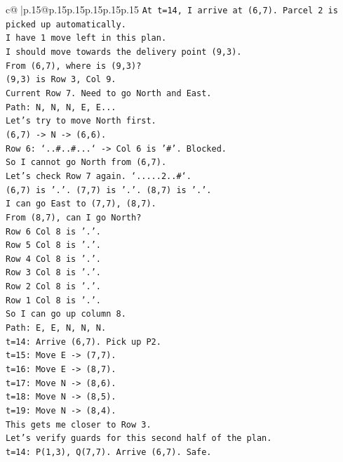 \documentclass{article}
\begin{document}
{\begin{supertabular}{c@{$\;$}|p{.15\linewidth}@{}p{.15\linewidth}p{.15\linewidth}p{.15\linewidth}p{.15\linewidth}p{.15\linewidth}}
{{{\texttt{At t=14, I arrive at (6,7). Parcel 2 is picked up automatically.} \\
\texttt{I have 1 move left in this plan.} \\
\texttt{I should move towards the delivery point (9,3).} \\
\texttt{From (6,7), where is (9,3)?} \\
\texttt{(9,3) is Row 3, Col 9.} \\
\texttt{Current Row 7. Need to go North and East.} \\
\texttt{Path: N, N, N, E, E...} \\
\texttt{Let's try to move North first.} \\
\texttt{(6,7) {-}> N {-}> (6,6).} \\
\texttt{Row 6: `..\#..\#...` {-}> Col 6 is '\#'. Blocked.} \\
\texttt{So I cannot go North from (6,7).} \\
\texttt{Let's check Row 7 again. `.....2..\#`.} \\
\texttt{(6,7) is '.'. (7,7) is '.'. (8,7) is '.'.} \\
\texttt{I can go East to (7,7), (8,7).} \\
\texttt{From (8,7), can I go North?} \\
\texttt{Row 6 Col 8 is '.'.} \\
\texttt{Row 5 Col 8 is '.'.} \\
\texttt{Row 4 Col 8 is '.'.} \\
\texttt{Row 3 Col 8 is '.'.} \\
\texttt{Row 2 Col 8 is '.'.} \\
\texttt{Row 1 Col 8 is '.'.} \\
\texttt{So I can go up column 8.} \\
\texttt{Path: E, E, N, N, N.} \\
\texttt{t=14: Arrive (6,7). Pick up P2.} \\
\texttt{t=15: Move E {-}> (7,7).} \\
\texttt{t=16: Move E {-}> (8,7).} \\
\texttt{t=17: Move N {-}> (8,6).} \\
\texttt{t=18: Move N {-}> (8,5).} \\
\texttt{t=19: Move N {-}> (8,4).} \\
\texttt{This gets me closer to Row 3.} \\
\texttt{Let's verify guards for this second half of the plan.} \\
\texttt{t=14: P(1,3), Q(7,7). Arrive (6,7). Safe.} \\
}}}
\end{supertabular}}
\end{document}
